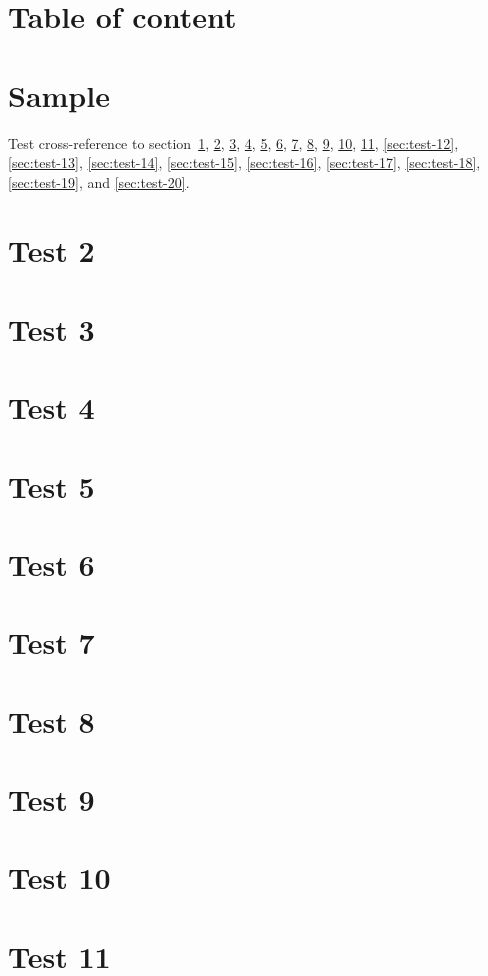 \documentclass[a4paper]{article}
\begin{document}
\section*{Table of content}
\tableofcontents
\section{Sample}
\label{sec:test-1}
Test cross-reference to section~\ref{sec:test-1}, \ref{sec:test-2}, \ref{sec:test-3},
\ref{sec:test-4}, \ref{sec:test-5}, \ref{sec:test-6},
\ref{sec:test-7}, \ref{sec:test-8}, \ref{sec:test-9},
\ref{sec:test-10}, \ref{sec:test-11}, \ref{sec:test-12},
\ref{sec:test-13}, \ref{sec:test-14}, \ref{sec:test-15},
\ref{sec:test-16}, \ref{sec:test-17}, \ref{sec:test-18},
\ref{sec:test-19}, and \ref{sec:test-20}.
\section{Test 2}
\label{sec:test-2}
\section{Test 3}
\label{sec:test-3}
\section{Test 4}
\label{sec:test-4}
\section{Test 5}
\label{sec:test-5}
\section{Test 6}
\label{sec:test-6}
\section{Test 7}
\label{sec:test-7}
\section{Test 8}
\label{sec:test-8}
\section{Test 9}
\label{sec:test-9}
\section{Test 10}
\label{sec:test-10}
\section{Test 11}
\label{sec:test-11}
\end{document}

